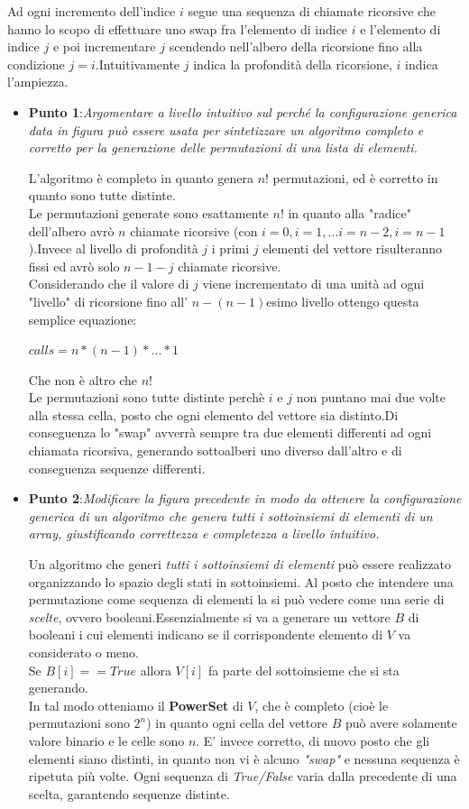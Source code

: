 \documentclass[a4paper]{article}
\begin{document}
Ad ogni incremento dell'indice $i$ segue una sequenza di chiamate ricorsive che hanno lo scopo di effettuare uno swap fra l'elemento di indice $i$ e l'elemento di indice $j$ e poi incrementare $j$ scendendo nell'albero della ricorsione fino alla condizione $j=i$.Intuitivamente $j$ indica la profondità della ricorsione, $i$ indica l'ampiezza.
\begin{itemize}
	\item \textbf{Punto 1}:\emph{Argomentare a livello intuitivo sul perché la configurazione generica data in figura può essere usata per sintetizzare un algoritmo completo e corretto per la generazione delle permutazioni di una lista di elementi.}


L'algoritmo è completo in quanto genera $n!$ permutazioni, ed è corretto in quanto sono tutte distinte.\\Le permutazioni generate sono esattamente $n!$ in quanto alla "radice" dell'albero avrò $n$ chiamate ricorsive (con $i = 0, i=1, ... i= n-2, i=n-1$ ).Invece al livello di profondità $j$ i primi $j$ elementi del vettore risulteranno fissi ed avrò solo $n-1-j$ chiamate ricorsive.\\Considerando che il valore di $j$ viene incrementato di una unità ad ogni "livello" di ricorsione fino all' $n-(n-1)$esimo livello ottengo questa semplice equazione: \begin{center}$calls = n * (n-1) * ... * 1$\end{center}Che non è altro che $n!$\\
		Le permutazioni sono tutte distinte perchè $i$ e $j$ non puntano mai due volte alla stessa cella, posto che ogni elemento del vettore sia distinto.Di conseguenza lo "swap" avverrà sempre tra due elementi differenti ad ogni chiamata ricorsiva, generando sottoalberi uno diverso dall'altro e di conseguenza sequenze differenti.
	\item \textbf{Punto 2}:\emph{Modificare la figura precedente in modo da ottenere la configurazione generica di un algoritmo che genera tutti i sottoinsiemi di elementi di un array, giustificando correttezza e completezza a livello intuitivo.}


		Un algoritmo che generi \textit{tutti i sottoinsiemi di elementi} può essere realizzato organizzando lo spazio degli stati in sottoinsiemi.
		Al posto che intendere una permutazione come sequenza di elementi la si può vedere come una serie di \textit{scelte}, ovvero booleani.Essenzialmente si va a generare un vettore $B$ di booleani i cui elementi indicano se il corrispondente elemento di $V$ va considerato o meno.\\
		Se $B[i] == True$ allora $V[i]$ fa parte del sottoinsieme che si sta generando.\\
		In tal modo otteniamo il \textbf{PowerSet} di $V$, che è completo (cioè le permutazioni sono $2^n$) in quanto ogni cella del vettore $B$ può avere solamente valore binario e le celle sono $n$.
		E' invece corretto, di nuovo posto che gli elementi siano distinti, in quanto non vi è alcuno \textit{"swap"} e nessuna sequenza è ripetuta più volte. Ogni sequenza di \textit{True/False} varia dalla precedente di una scelta, garantendo sequenze distinte.
\end{itemize}
\end{document}
